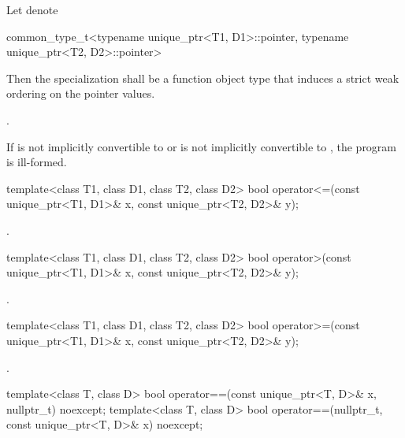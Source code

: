 \begin{itemdescr}
\pnum
\requires Let  denote
\begin{codeblock}
common_type_t<typename unique_ptr<T1, D1>::pointer,
              typename unique_ptr<T2, D2>::pointer>
\end{codeblock}
Then the specialization
 shall be a function object type that
induces a strict weak ordering on the pointer values.

\pnum
\returns {}.

\pnum
\remarks If  is not implicitly convertible
to  or  is not implicitly
convertible to , the program is ill-formed.
\end{itemdescr}

%
\begin{itemdecl}
template<class T1, class D1, class T2, class D2>
  bool operator<=(const unique_ptr<T1, D1>& x, const unique_ptr<T2, D2>& y);
\end{itemdecl}

\begin{itemdescr}
\pnum
\returns {}.
\end{itemdescr}

%
\begin{itemdecl}
template<class T1, class D1, class T2, class D2>
  bool operator>(const unique_ptr<T1, D1>& x, const unique_ptr<T2, D2>& y);
\end{itemdecl}

\begin{itemdescr}
\pnum
\returns {}.
\end{itemdescr}

%
\begin{itemdecl}
template<class T1, class D1, class T2, class D2>
  bool operator>=(const unique_ptr<T1, D1>& x, const unique_ptr<T2, D2>& y);
\end{itemdecl}

\begin{itemdescr}
\pnum
\returns {}.
\end{itemdescr}

%
\begin{itemdecl}
template<class T, class D>
  bool operator==(const unique_ptr<T, D>& x, nullptr_t) noexcept;
template<class T, class D>
  bool operator==(nullptr_t, const unique_ptr<T, D>& x) noexcept;
\end{itemdecl}

